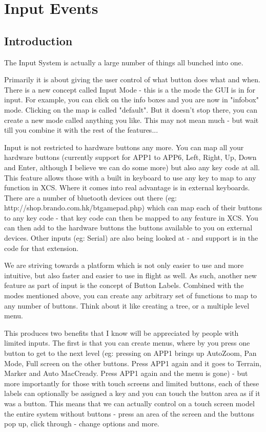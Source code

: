 \section{Input Events}

\subsection{Introduction}

The Input System is actually a large number of things all bunched into one.

Primarily it is about giving the user control of what button does what
and when. There is a new concept called Input Mode - this is a the
mode the GUI is in for input. For example, you can click on the info
boxes and you are now in "infobox" mode. Clicking on the map is called
"default". But it doesn't stop there, you can create a new mode called
anything you like. This may not mean much - but wait till you combine
it with the rest of the features...

Input is not restricted to hardware buttons any more. You can map all
your hardware buttons (currently support for APP1 to APP6, Left,
Right, Up, Down and Enter, although I believe we can do some more) but
also any key code at all. This feature allows those with a built in
keyboard to use any key to map to any function in XCS. Where it comes
into real advantage is in external keyboards. There are a number of
bluetooth devices out there (eg:
http://shop.brando.com.hk/btgamepad.php) which can map each of their
buttons to any key code - that key code can then be mapped to any
feature in XCS. You can then add to the hardware buttons the buttons
available to you on external devices. Other inputs (eg: Serial) are
also being looked at - and support is in the code for that extension.

We are striving towards a platform which is not only easier to use and
more intuitive, but also faster and easier to use in flight as
well. As such, another new feature as part of input is the concept of
Button Labels. Combined with the modes mentioned above, you can create
any arbitrary set of functions to map to any number of buttons. Think
about it like creating a tree, or a multiple level menu.

This produces two benefits that I know will be appreciated by people
with limited inputs. The first is that you can create menus, where by
you press one button to get to the next level (eg: pressing on APP1
brings up AutoZoom, Pan Mode, Full screen on the other buttons. Press
APP1 again and it goes to Terrain, Marker and Auto MacCready. Press
APP1 again and the menu is gone) - but more importantly for those with
touch screens and limited buttons, each of these labels can optionally
be assigned a key and you can touch the button area as if it was a
button.  This means that we can actually control on a touch screen
model the entire system without buttons - press an area of the screen
and the buttons pop up, click through - change options and more.

